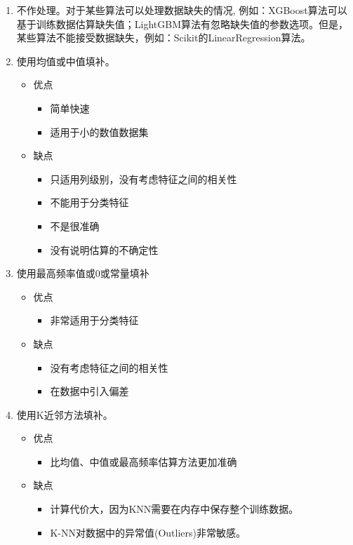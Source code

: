 \documentclass[UTF8,a4paper,12pt, onecolumn]{ctexart}
\begin{document}
\begin{enumerate}
	\item 不作处理。对于某些算法可以处理数据缺失的情况, 例如：XGBoost算法可以基于训练数据估算缺失值；LightGBM算法有忽略缺失值的参数选项。但是，某些算法不能接受数据缺失，例如：Scikit的LinearRegression算法。
	\item 使用均值或中值填补。
	\begin{itemize}
		\item 优点
		\begin{itemize} 
			\item 简单快速
			\item 适用于小的数值数据集
		\end{itemize}
		\item 缺点
		\begin{itemize}
			\item 只适用列级别，没有考虑特征之间的相关性
			\item 不能用于分类特征
			\item 不是很准确
			\item 没有说明估算的不确定性
		\end{itemize}
	\end{itemize}
	\item 使用最高频率值或0或常量填补
	\begin{itemize}
		\item 优点
		\begin{itemize}
		\item 非常适用于分类特征
		\end{itemize}
		\item 缺点
		\begin{itemize}
  			\item 没有考虑特征之间的相关性
  			\item 在数据中引入偏差
		\end{itemize}
	\end{itemize}
	\item 使用K近邻方法填补。
	\begin{itemize}
		\item 优点
		\begin{itemize}
		  \item 比均值、中值或最高频率估算方法更加准确
		\end{itemize}
		\item 缺点
		\begin{itemize}
		  \item 计算代价大，因为KNN需要在内存中保存整个训练数据。
		  \item K-NN对数据中的异常值(Outliers)非常敏感。

\end{itemize}
\end{itemize}
\end{enumerate}
\end{document}
